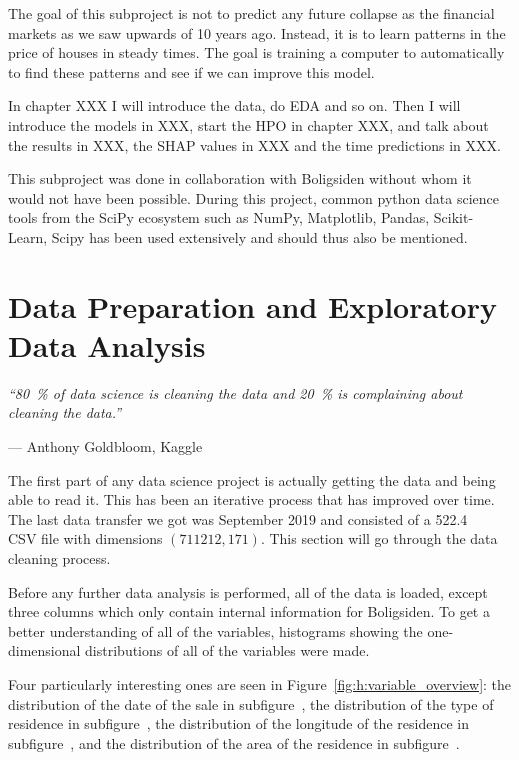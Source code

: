 The goal of this subproject is not to predict any future collapse as the financial markets as we saw upwards of 10 years ago. Instead, it is to learn patterns in the price of houses in steady times. The goal is training a computer to automatically to find these patterns and see if we can improve this model.

In chapter XXX I will introduce the data, do EDA and so on. Then I will introduce the models in XXX, start the HPO in chapter XXX, and talk about the results in XXX, the SHAP values in XXX and the time predictions in XXX. 

This subproject was done in collaboration with Boligsiden without whom it would not have been possible. During this project, common python data science tools from the SciPy ecosystem\autocite{virtanenSciPyFundamentalAlgorithms2019} such as NumPy, Matplotlib, Pandas, Scikit-Learn, Scipy has been used extensively and should thus also be mentioned. 

\section{Data Preparation and Exploratory Data Analysis}
\label{sec:h:data_cleaning}
\epigraph{\textit{``\SI{80}{\percent} of data science is cleaning the data and \SI{20}{\percent} is complaining about cleaning the data.''}}{--- Anthony Goldbloom, Kaggle}


The first part of any data science project is actually getting the data and being able to read it. This has been an iterative process that has improved over time. The last data transfer we got was September  2019 and consisted of a \SI{522.4}{\mega\byte} CSV file with dimensions $(\num{711212}, \num{171})$. This section will go through the data cleaning process.

Before any further data analysis is performed, all of the data is loaded, except three columns which only contain internal information for Boligsiden. To get a better understanding of all of the variables, histograms showing the one-dimensional distributions of all of the variables were made.

Four particularly interesting ones are seen in Figure~\ref{fig:h:variable_overview}: 
the distribution of the date of the sale  in subfigure~,  
the distribution of the type of residence  in subfigure~,
the distribution of the longitude of the residence  in subfigure~, and
the distribution of the area of the residence  in subfigure~.

